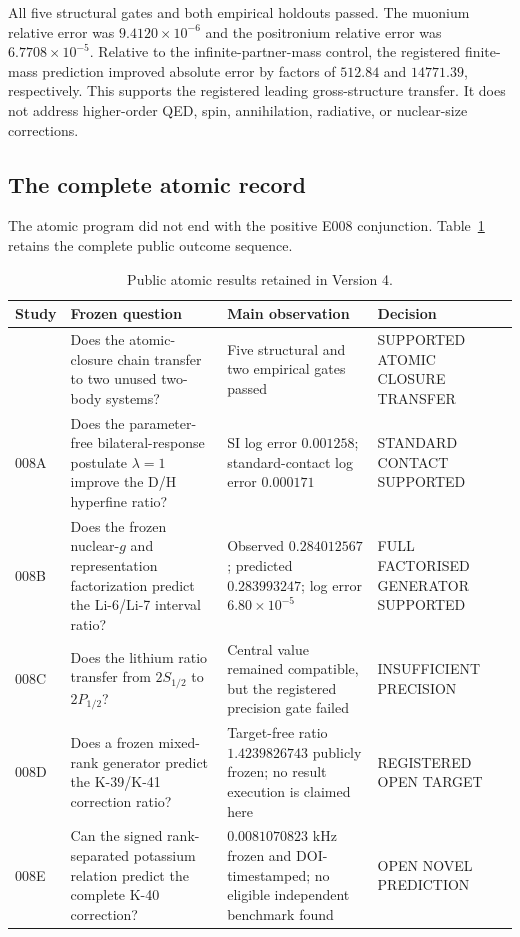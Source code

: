 \documentclass[11pt,a4paper]{article}
\begin{document}
All five structural gates and both empirical holdouts passed. The muonium relative error was $9.4120\times10^{-6}$ and the positronium relative error was $6.7708\times10^{-5}$. Relative to the infinite-partner-mass control, the registered finite-mass prediction improved absolute error by factors of $512.84$ and $14771.39$, respectively. This supports the registered leading gross-structure transfer. It does not address higher-order QED, spin, annihilation, radiative, or nuclear-size corrections.

\subsection{The complete atomic record}

The atomic program did not end with the positive E008 conjunction. Table~\ref{tab:atomic-record} retains the complete public outcome sequence.

\begin{table}[H]
\centering
\footnotesize
\caption{Public atomic results retained in Version 4.}
\label{tab:atomic-record}
\begin{tabularx}{\textwidth}{@{}>{\raggedright\arraybackslash}p{1.25cm}>{\raggedright\arraybackslash}p{4.0cm}>{\raggedright\arraybackslash}X>{\raggedright\arraybackslash}p{3.15cm}@{}}
\toprule
Study & Frozen question & Main observation & Decision \\
\midrule
008 & Does the atomic-closure chain transfer to two unused two-body systems? & Five structural and two empirical gates passed & \textsf{SUPPORTED ATOMIC CLOSURE TRANSFER} \\
008A & Does the parameter-free bilateral-response postulate $\lambda=1$ improve the D/H hyperfine ratio? & SI log error $0.001258$; standard-contact log error $0.000171$ & \textsf{STANDARD CONTACT SUPPORTED} \\
008B & Does the frozen nuclear-$g$ and representation factorization predict the Li-6/Li-7 interval ratio? & Observed $0.284012567$; predicted $0.283993247$; log error $6.80\times10^{-5}$ & \textsf{FULL FACTORISED GENERATOR SUPPORTED} \\
008C & Does the lithium ratio transfer from $2S_{1/2}$ to $2P_{1/2}$? & Central value remained compatible, but the registered precision gate failed & \textsf{INSUFFICIENT PRECISION} \\
008D & Does a frozen mixed-rank generator predict the K-39/K-41 correction ratio? & Target-free ratio $1.4239826743$ publicly frozen; no result execution is claimed here & \textsf{REGISTERED OPEN TARGET} \\
008E & Can the signed rank-separated potassium relation predict the complete K-40 correction? & $0.0081070823$ kHz frozen and DOI-timestamped; no eligible independent benchmark found & \textsf{OPEN NOVEL PREDICTION} \\
\bottomrule
\end{tabularx}
\end{table}
\end{document}
